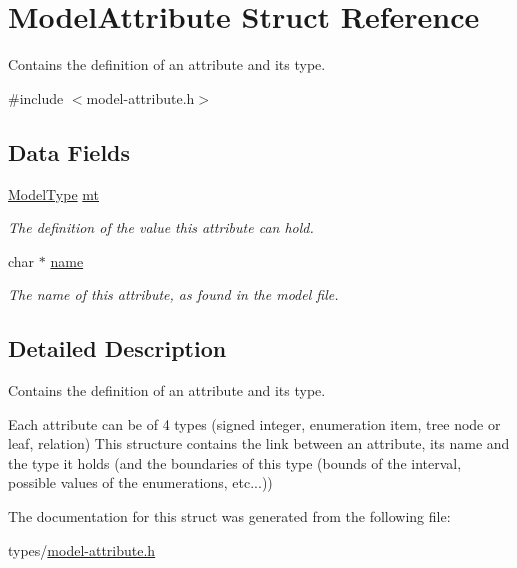 \hypertarget{struct_model_attribute}{}\section{Model\+Attribute Struct Reference}
\label{struct_model_attribute}


Contains the definition of an attribute and its type.  




{\ttfamily \#include $<$model-\/attribute.\+h$>$}

\subsection*{Data Fields}
\begin{DoxyCompactItemize}
\item 
\hyperlink{struct_model_type}{Model\+Type} \hyperlink{struct_model_attribute_a6ece8f86b3a97eee8478c253ff36a6eb}{mt}\hypertarget{struct_model_attribute_a6ece8f86b3a97eee8478c253ff36a6eb}{}\label{struct_model_attribute_a6ece8f86b3a97eee8478c253ff36a6eb}

\begin{DoxyCompactList}\small\item\em The definition of the value this attribute can hold. \end{DoxyCompactList}\item 
char $\ast$ \hyperlink{struct_model_attribute_a5ac083a645d964373f022d03df4849c8}{name}\hypertarget{struct_model_attribute_a5ac083a645d964373f022d03df4849c8}{}\label{struct_model_attribute_a5ac083a645d964373f022d03df4849c8}

\begin{DoxyCompactList}\small\item\em The name of this attribute, as found in the model file. \end{DoxyCompactList}\end{DoxyCompactItemize}


\subsection{Detailed Description}
Contains the definition of an attribute and its type. 

Each attribute can be of 4 types (signed integer, enumeration item, tree node or leaf, relation) This structure contains the link between an attribute, its name and the type it holds (and the boundaries of this type (bounds of the interval, possible values of the enumerations, etc...)) 

The documentation for this struct was generated from the following file\+:\begin{DoxyCompactItemize}
\item 
types/\hyperlink{model-attribute_8h}{model-\/attribute.\+h}\end{DoxyCompactItemize}
